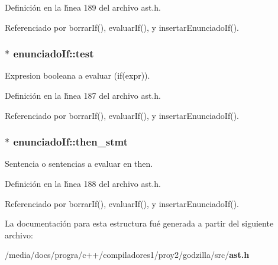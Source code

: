 Definici\'{o}n en la l\'{\i}nea 189 del archivo ast.h.

Referenciado por borrar\-If(), evaluar\-If(), y insertar\-Enunciado\-If().
\subsubsection{$\ast$ {\bf enunciado\-If::test}}\label{structenunciadoIf_o0}


Expresion booleana a evaluar (if(expr)). 



Definici\'{o}n en la l\'{\i}nea 187 del archivo ast.h.

Referenciado por borrar\-If(), evaluar\-If(), y insertar\-Enunciado\-If().
\subsubsection{$\ast$ {\bf enunciado\-If::then\_\-stmt}}\label{structenunciadoIf_o1}


Sentencia o sentencias a evaluar en then. 



Definici\'{o}n en la l\'{\i}nea 188 del archivo ast.h.

Referenciado por borrar\-If(), evaluar\-If(), y insertar\-Enunciado\-If().

La documentaci\'{o}n para esta estructura fu\'{e} generada a partir del siguiente archivo:\begin{CompactItemize}
\item 
/media/docs/progra/c++/compiladores1/proy2/godzilla/src/{\bf ast.h}\end{CompactItemize}
